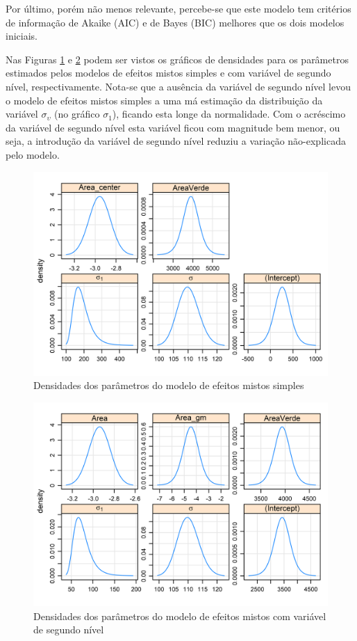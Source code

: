 \documentclass[
  a4paper, 12pt]{article}
\begin{document}
Por último, porém não menos relevante, percebe-se que este modelo tem
critérios de informação de Akaike (AIC) e de Bayes (BIC) melhores que os
dois modelos iniciais.

Nas Figuras \ref{fig:pr1} e \ref{fig:pr2} podem ser vistos os gráficos
de densidades para os parâmetros estimados pelos modelos de efeitos
mistos simples e com variável de segundo nível, respectivamente. Nota-se
que a ausência da variável de segundo nível levou o modelo de efeitos
mistos simples a uma má estimação da distribuição da variável
\(\sigma_\upsilon\) (no gráfico \(\sigma_1\)), ficando esta longe da
normalidade. Com o acréscimo da variável de segundo nível esta variável
ficou com magnitude bem menor, ou seja, a introdução da variável de
segundo nível reduziu a variação não-explicada pelo modelo.

\begin{figure}[H]

{\centering \includegraphics[width=0.66\linewidth]{images/pr1-1} 

}

\caption{Densidades dos parâmetros do modelo de efeitos mistos simples}\label{fig:pr1}
\end{figure}

\begin{figure}[H]

{\centering \includegraphics[width=1\linewidth]{images/pr2-1} 

}

\caption{Densidades dos parâmetros do modelo de efeitos mistos com variável de segundo nível}\label{fig:pr2}
\end{figure}
\end{document}

